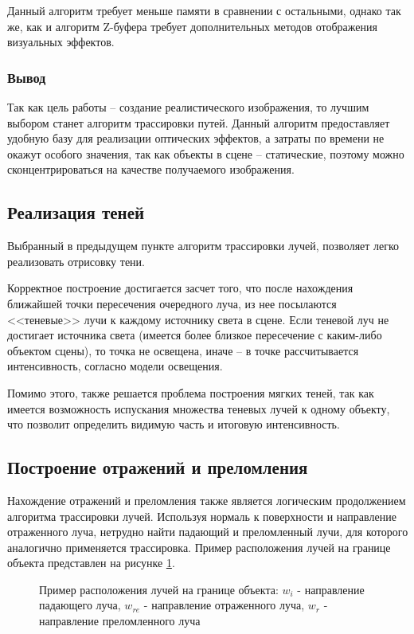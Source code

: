 Данный алгоритм требует меньше памяти в сравнении с остальными,
однако так же, как и алгоритм Z-буфера требует дополнительных методов
отображения визуальных эффектов.

\subsubsection*{Вывод}
Так как цель работы -- создание реалистического изображения, то лучшим
выбором станет алгоритм трассировки путей. Данный алгоритм предоставляет
удобную базу для реализации оптических эффектов, а затраты по времени не окажут
особого значения, так как объекты в сцене -- статические, поэтому можно
сконцентрироваться на качестве получаемого изображения.

\subsection{Реализация теней}
Выбранный в предыдущем пункте алгоритм трассировки лучей, позволяет
легко реализовать отрисовку тени.

Корректное построение достигается засчет того, что после нахождения
ближайшей точки пересечения очередного луча, из нее посылаются <<теневые>> лучи
к каждому источнику света в сцене. Если теневой луч не достигает источника света
(имеется более близкое пересечение с каким-либо объектом сцены), то точка не
освещена, иначе -- в точке рассчитывается интенсивность, согласно модели
освещения.

Помимо этого, также решается проблема построения мягких теней, так как
имеется возможность испускания множества теневых лучей к одному объекту, что
позволит определить видимую часть и итоговую интенсивность.

\subsection{Построение отражений и преломления}
Нахождение отражений и преломления также является логическим
продолжением алгоритма трассировки лучей. Используя нормаль к поверхности и
направление отраженного луча, нетрудно найти падающий и преломленный лучи,
для которого аналогично применяется трассировка. Пример расположения лучей
на границе объекта представлен на рисунке \ref{fig:edge_ray}.

\begin{figure}[h]
    \centering
    \def\svgwidth{0.6\textwidth}
    
    \caption{Пример расположения лучей на границе объекта: $w_i$ - направление
             падающего луча, $w_{re}$ - направление отраженного луча,
             $w_r$ - направление преломленного луча}
    \label{fig:edge_ray}
\end{figure}

